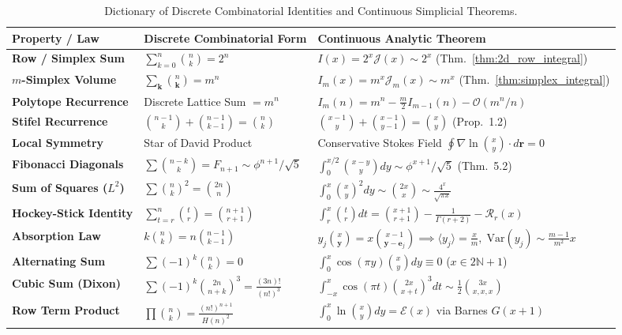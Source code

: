 \documentclass[11pt,a4paper]{article}
\theoremstyle{plain}
\theoremstyle{definition}
\theoremstyle{remark}
\numberwithin{equation}{section}
\begin{document}
\begin{table}[htbp]
\centering
\small
\caption{Dictionary of Discrete Combinatorial Identities and Continuous Simplicial Theorems.}
\label{tab:dictionary}
\begin{tabularx}{\textwidth}{lXX}
\toprule
\textbf{Property / Law} & \textbf{Discrete Combinatorial Form} & \textbf{Continuous Analytic Theorem} \\
\midrule
\textbf{Row / Simplex Sum} & $\sum_{k=0}^n \binom{n}{k} = 2^n$ & $I(x) = 2^x \mathcal{J}(x) \sim 2^x$ (Thm.~\ref{thm:2d_row_integral}) \\
\textbf{$m$-Simplex Volume} & $\sum_{\mathbf{k}} \binom{n}{\mathbf{k}} = m^n$ & $I_m(x) = m^x \mathcal{J}_m(x) \sim m^x$ (Thm.~\ref{thm:simplex_integral}) \\
\textbf{Polytope Recurrence} & Discrete Lattice Sum $= m^n$ & $I_m(n) = m^n - \frac{m}{2}I_{m-1}(n) - \mathcal{O}(m^n/n)$ \\
\textbf{Stifel Recurrence} & $\binom{n-1}{k} + \binom{n-1}{k-1} = \binom{n}{k}$ & $\binom{x-1}{y} + \binom{x-1}{y-1} = \binom{x}{y}$ (Prop.~1.2) \\
\textbf{Local Symmetry} & Star of David Product \cite{gould1972} & Conservative Stokes Field $\oint \nabla\ln\binom{x}{y}\cdot d\mathbf{r} = 0$ \\
\textbf{Fibonacci Diagonals} & $\sum \binom{n-k}{k} = F_{n+1} \sim \phi^{n+1}/\sqrt{5}$ & $\int_0^{x/2} \binom{x-y}{y}dy \sim \phi^{x+1}/\sqrt{5}$ (Thm.~5.2) \\
\textbf{Sum of Squares ($L^2$)} & $\sum \binom{n}{k}^2 = \binom{2n}{n}$ & $\int_0^x \binom{x}{y}^2 dy \sim \binom{2x}{x} \sim \frac{4^x}{\sqrt{\pi x}}$ \\
\textbf{Hockey-Stick Identity} & $\sum_{t=r}^n \binom{t}{r} = \binom{n+1}{r+1}$ & $\int_r^x \binom{t}{r}dt = \binom{x+1}{r+1} - \frac{1}{\Gamma(r+2)} - \mathcal{R}_r(x)$ \\
\textbf{Absorption Law} & $k\binom{n}{k} = n\binom{n-1}{k-1}$ & $y_j \binom{x}{\mathbf{y}} = x \binom{x-1}{\mathbf{y}-\mathbf{e}_j} \implies \langle y_j \rangle = \frac{x}{m},\; \mathrm{Var}(y_j) \sim \frac{m-1}{m^2}x$ \\
\textbf{Alternating Sum} & $\sum (-1)^k \binom{n}{k} = 0$ & $\int_0^x \cos(\pi y)\binom{x}{y}dy \equiv 0$ ($x \in 2\mathbb{N}+1$) \\
\textbf{Cubic Sum (Dixon)} & $\sum (-1)^k \binom{2n}{n+k}^3 = \frac{(3n)!}{(n!)^3}$ \cite{dixon1891} & $\int_{-x}^x \cos(\pi t)\binom{2x}{x+t}^3 dt \sim \frac{1}{2}\binom{3x}{x,x,x}$ \\
\textbf{Row Term Product} & $\prod \binom{n}{k} = \frac{(n!)^{n+1}}{H(n)^2}$ & $\int_0^x \ln\binom{x}{y}dy = \mathcal{E}(x)$ via Barnes $G(x+1)$ \cite{barnes1900} \\
\bottomrule
\end{tabularx}
\end{table}
\end{document}
